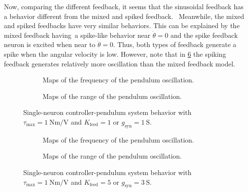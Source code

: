 Now, comparing the different feedback, it seems that the sinusoidal feedback has a behavior different from the mixed and spiked feedback. 
Meanwhile, the mixed and spiked feedbacks have very similar behaviors.
This can be explained by the mixed feedback having a spike-like behavior near $\dot{\theta}=0$ and the spike feedback neuron is excited when near to $\dot{\theta}=0$.
Thus, both types of feedback generate a spike when the angular velocity is low.
However, note that in \cref{fig:single_t1_high} the spiking feedback generates relatively more oscillation than the mixed feedback model.

\begin{figure}[!htbp]
    \centering
    \begin{subfigure}[t][.46\textheight][b]{\textwidth}
        \centering
        \caption{Maps of the frequency of the pendulum oscillation.}
        \label{fig:single_t1_low_freq}
    \end{subfigure}
    
    \begin{subfigure}[b][.46\textheight][t]{\textwidth}
        \centering
        \caption{Maps of the range of the pendulum oscillation.}
        \label{fig:single_t1_low_range}
    \end{subfigure}
    \caption{Single-neuron controller-pendulum system behavior with $\tau_\text{max} = \qty{1}{\newton\meter\per\volt}$ and $K_\text{feed} = 1$ or $g_{\text{syn}} = \qty{1}{\siemens}$.}
    \label{fig:single_t1_low}
\end{figure}

\begin{figure}[!htbp]
    \centering
    \begin{subfigure}[t][.46\textheight][b]{\textwidth}
        \centering
        \caption{Maps of the frequency of the pendulum oscillation.}
        \label{fig:single_t1_high_freq}  
    \end{subfigure}
    
    \begin{subfigure}[b][.46\textheight][t]{\textwidth}
        \centering
        \caption{Maps of the range of the pendulum oscillation.}
        \label{fig:single_t1_high_range}  
    \end{subfigure}
    \caption{Single-neuron controller-pendulum system behavior with $\tau_\text{max}=\qty{1}{\newton\meter\per\volt}$ and $K_\text{feed} = 5$ or $g_{\text{syn}} = \qty{3}{\siemens}$.}
    \label{fig:single_t1_high}
\end{figure}

